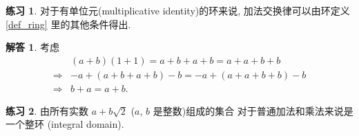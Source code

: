 \documentclass[utf8]{ctexbook}
\theoremstyle{definition}
\newtheorem{exercise}{练习}[section]
\newtheorem*{soln}{解答}
\begin{document}
\begin{exercise}
对于有单位元(multiplicative identity)的环来说, 加法交换律可以由环定义 \ref{def_ring} 里的其他条件得出.
\end{exercise}

\begin{soln}
考虑
\begin{align*}
 & (a+b) (1+1) = a+b+a+b = a+a+b+b  \\
 \Rightarrow & -a + (a+b+a+b) - b = -a + (a+a+b+b ) -b \\
 \Rightarrow & b+a = a + b   .
\end{align*}

\end{soln}


\begin{exercise}
由所有实数 $a + b \sqrt{2}$ ($a$, $b$ 是整数)组成的集合 对于普通加法和乘法来说是一个整环 (integral domain).
\end{exercise}
\end{document}
